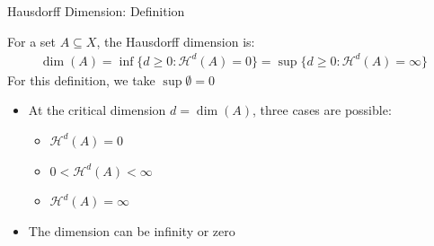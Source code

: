\documentclass{beamer}
\begin{document}
\begin{frame}{Hausdorff Dimension: Definition}
    \begin{definition}
        For a set $A \subseteq X$, the Hausdorff dimension is:
        \begin{align}
            \dim(A) = \inf\{d \geq 0 : \mathcal{H}^d(A) = 0\} = \sup\{d \geq 0 : \mathcal{H}^d(A) = \infty\}
        \end{align}
        For this definition, we take $\sup \emptyset =0$
    \end{definition}
    
    \begin{itemize}
        \item At the critical dimension $d = \dim(A)$, three cases are possible:
            \begin{itemize}
                \item $\mathcal{H}^d(A) = 0$

                \item $0 < \mathcal{H}^d(A) < \infty$

                \item $\mathcal{H}^d(A) = \infty$

            \end{itemize}
        \item The dimension can be infinity or zero
    \end{itemize}
\end{frame}
\end{document}
